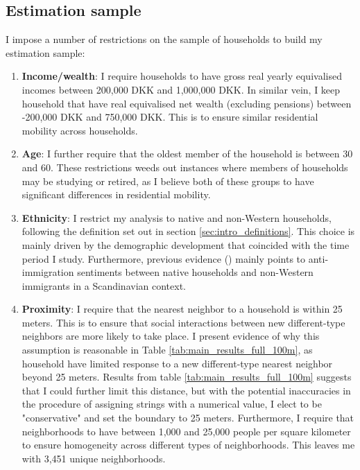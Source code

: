 \documentclass[main.tex]{subfiles}
\begin{document}
\newpage
\subsection{Estimation sample}
\label{sec:estimation_sample_definition}
I impose a number of restrictions on the sample of households to build my estimation sample:

\begin{enumerate}
    \item \textbf{Income/wealth}: I require households to have gross real yearly equivalised incomes between 200,000 DKK and 1,000,000 DKK. In similar vein, I keep household that have real equivalised net wealth (excluding pensions) between -200,000 DKK and 750,000 DKK. This is to ensure similar residential mobility across households. 
    \item \textbf{Age}: I further require that the oldest member of the household is between 30 and 60. These restrictions weeds out instances where members of households may be studying or retired, as I believe both of these groups to have significant differences in residential mobility.
    \item \textbf{Ethnicity}: I restrict my analysis to native and non-Western households, following the definition set out in section \ref{sec:intro_definitions}. This choice is mainly driven by the demographic development that coincided with the time period I study. Furthermore, previous evidence (\textcite{bohlmark_willen_2020_tipping, legrand_2002_immigrant_discontent, rockwool_boje2024immigrants}) mainly points to anti-immigration sentiments between native households and non-Western immigrants in a Scandinavian context.
    \item \textbf{Proximity}: I require that the nearest neighbor to a household is within 25 meters. This is to ensure that social interactions between new different-type neighbors are more likely to take place. I present evidence of why this assumption is reasonable in Table \ref{tab:main_results_full_100m}, as household have limited response to a new different-type nearest neighbor beyond 25 meters. Results from table \ref{tab:main_results_full_100m} suggests that I could further limit this distance, but with the potential inaccuracies in the procedure of assigning strings with a numerical value, I elect to be "conservative" and set the boundary to 25 meters. Furthermore, I require that neighborhoods to have between 1,000 and 25,000 people per square kilometer to ensure homogeneity across different types of neighborhoods. This leaves me with 3,451 unique neighborhoods.
\end{enumerate}
\end{document}
